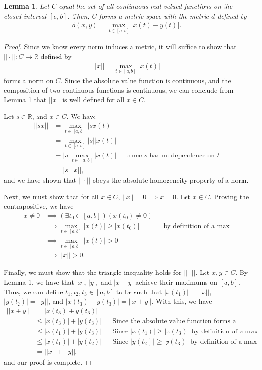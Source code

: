 \documentclass[10pt,a4paper]{article}
\theoremstyle{theorem}
\newtheorem{lemma}{Lemma}
\theoremstyle{definition}
\begin{document}
\begin{lemma}
Let $C$ equal the set of all continuous real-valued functions on the closed interval $[a, b]$. Then, $C$ forms a metric space with the metric $d$ defined by
\begin{align*}
d(x, y) = \max_{t \in [a, b]} |x(t) - y(t)|.
\end{align*}
\end{lemma}

\begin{proof}
Since we know every norm induces a metric, it will suffice to show that $|| \cdot ||: C \to \mathbb{R}$ defined by
\begin{align*}
||x|| = \max_{t \in [a, b]} |x(t)|
\end{align*}
forms a norm on $C$. Since the absolute value function is continuous, and the composition of two continuous functions is continuous, we can conclude from Lemma 1 that $|| x ||$ is well defined for all $x \in C$.

Let $s \in \mathbb{R}$, and $x \in C$. We have
\begin{align*}
||s x|| &= \max_{t \in [a, b]} |s x(t)|\\
&= \max_{t \in [a, b]} |s|| x(t)|\\
&= |s|\max_{t \in [a, b]} | x(t)| && \text{since } s \text{ has no dependence on } t\\
&= |s|||x||,
\end{align*}
and we have shown that $|| \cdot ||$ obeys the absolute homogeneity property of a norm.

Next, we must show that for all $x \in C$, $||x|| = 0 \implies x = 0$. Let $x \in C$. Proving the contrapositive, we have 
\begin{align*}
x \not = 0 &\implies (\exists t_0 \in [a, b])(x(t_0) \not = 0)\\
&\implies \max_{t \in [a, b]} |x(t)| \geq |x(t_0)| && \text{by definition of a max}\\
&\implies \max_{t \in [a, b]} |x(t)| > 0\\
&\implies ||x|| > 0.
\end{align*}

Finally, we must show that the triangle inequality holds for $|| \cdot ||$. Let $x, y \in C$. By Lemma 1, we have that $|x|$, $|y|, $ and $|x + y|$ achieve their maximums on $[a, b]$. Thus, we can define $t_1,t_2,t_3 \in [a, b]$ to be such that $|x(t_1)| = ||x||$, $|y(t_2)| = ||y||$, and $|x(t_3) + y(t_3)| = ||x + y||$. With this, we have
\begin{align*}
||x + y|| &= |x(t_3) + y(t_3)|\\
&\leq |x(t_3)| + |y(t_3)| && \text{Since the absolute value function forms a norm on the real numbers}\\
&\leq |x(t_1)| + |y(t_3)| && \text{Since } |x(t_1)| \geq |x(t_3)| \text{ by definition of a max}\\
&\leq |x(t_1)| + |y(t_2)| && \text{Since } |y(t_2)| \geq |y(t_3)| \text{ by definition of a max}\\
&= ||x|| + ||y||,
\end{align*}
and our proof is complete.
\end{proof}
\end{document}
